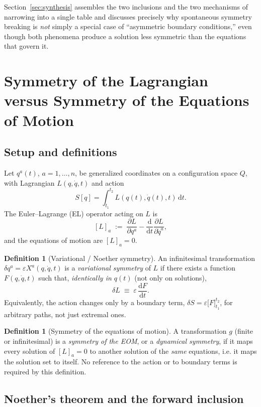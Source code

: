 \documentclass[11pt]{article}
\theoremstyle{definition}
\newtheorem{definition}[theorem]{Definition}
\theoremstyle{remark}
\newcommand{\dd}{\mathrm{d}}
\newcommand{\pdv}[2]{\dfrac{\partial #1}{\partial #2}}
\newcommand{\dv}[2]{\dfrac{\dd #1}{\dd #2}}
\newcommand{\eps}{\varepsilon}
\begin{document}
Section~\ref{sec:synthesis} assembles the two inclusions and the two mechanisms of narrowing into a single table and discusses precisely why spontaneous symmetry breaking is \emph{not} simply a special case of ``asymmetric boundary conditions,'' even though both phenomena produce a solution less symmetric than the equations that govern it.

\section{Symmetry of the Lagrangian versus Symmetry of the Equations of Motion}
\label{sec:LvsEOM}

\subsection{Setup and definitions}

Let $q^a(t)$, $a=1,\dots,n$, be generalized coordinates on a configuration space $Q$, with Lagrangian $L(q,\dot q,t)$ and action
\[
S[q] = \int_{t_1}^{t_2} L(q(t),\dot q(t),t)\,\dd t .
\]
The Euler--Lagrange (EL) operator acting on $L$ is
\[
[L]_a \;:=\; \pdv{L}{q^a} - \dv{}{t}\pdv{L}{\dot q^a},
\]
and the equations of motion are $[L]_a=0$.

\begin{definition}[Variational / Noether symmetry]
An infinitesimal transformation $\delta q^a = \eps X^a(q,\dot q,t)$ is a \emph{variational symmetry} of $L$ if there exists a function $F(q,\dot q,t)$ such that, \emph{identically in $q(t)$} (not only on solutions),
\[
\delta L \;\equiv\; \eps\, \dv{F}{t}.
\]
Equivalently, the action changes only by a boundary term, $\delta S = \eps\big[F\big]_{t_1}^{t_2}$, for arbitrary paths, not just extremal ones.
\end{definition}

\begin{definition}[Symmetry of the equations of motion]
A transformation $g$ (finite or infinitesimal) is a \emph{symmetry of the EOM}, or a \emph{dynamical symmetry}, if it maps every solution of $[L]_a=0$ to another solution of the \emph{same} equations, i.e. it maps the solution set to itself. No reference to the action or to boundary terms is required by this definition.
\end{definition}

\subsection{Noether's theorem and the forward inclusion}
\end{document}
